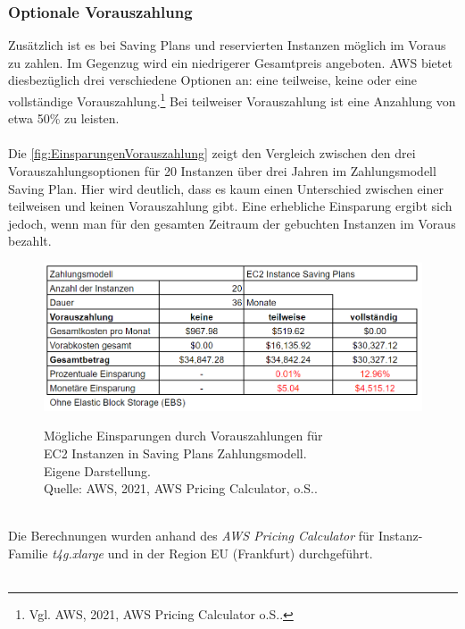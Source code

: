 \subsubsection*{Optionale Vorauszahlung}\label{sssec:Vorauszahlung}
Zusätzlich ist es bei Saving Plans und reservierten Instanzen möglich im Voraus zu zahlen. Im Gegenzug wird ein niedrigerer Gesamtpreis angeboten. AWS bietet diesbezüglich drei verschiedene Optionen an: eine teilweise, keine oder eine vollständige Vorauszahlung.\footnote{Vgl. AWS, 2021, AWS Pricing Calculator o.S.\cite{AMZ17}.} Bei teilweiser Vorauszahlung ist eine Anzahlung von etwa 50\% zu leisten.
\\\\
Die \autoref{fig:EinsparungenVorauszahlung} zeigt den Vergleich zwischen den drei Vorauszahlungsoptionen für 20 Instanzen über drei Jahren im Zahlungsmodell Saving Plan. Hier wird deutlich, dass es kaum einen Unterschied zwischen einer teilweisen und keinen Vorauszahlung gibt. Eine erhebliche Einsparung ergibt sich jedoch, wenn man für den gesamten Zeitraum der gebuchten Instanzen im Voraus bezahlt.
\begin{figure}[h!]
    \centering
    \includegraphics[scale=0.6]{sources/EinsparungenVorauszahlung}\label{fig:EinsparungenVorauszahlung}\\
    \caption[Mögliche Einsparungen durch Vorauszahlungen]{}
    \label{fig:EinsparungenVorauszahlung}
    Mögliche Einsparungen durch Vorauszahlungen für\\
    EC2 Instanzen in Saving Plans Zahlungsmodell.\\
    Eigene Darstellung. \\
    Quelle: AWS, 2021, AWS Pricing Calculator, o.S.\cite{AMZ17}.
  \end{figure}
  \\
Die Berechnungen wurden anhand des \textit{AWS Pricing Calculator} für Instanz-Familie \textit{t4g.xlarge} und in der Region EU (Frankfurt) durchgeführt.{\cite{AMZ17}} 
\\\\
